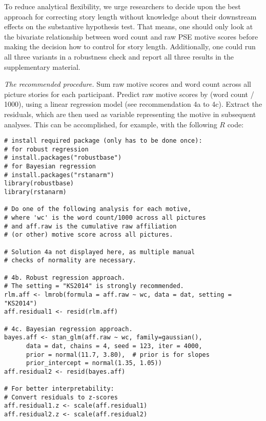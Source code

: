 \documentclass[man,a4paper,mask]{apa6}
\begin{document}
{To reduce analytical flexibility, we urge researchers to decide upon the best approach for correcting story length without knowledge about their downstream effects on the substantive hypothesis test. That means, one should only look at the bivariate relationship between word count and raw PSE motive scores before making the decision how to control for story length. Additionally, one could run all three variants in a robustness check and report all three results in the supplementary material.




\emph{The recommended procedure.} Sum raw motive scores and word count across all picture stories for each participant. Predict raw motive scores by (word count / 1000), using a linear regression model (see recommendation 4a to 4c). Extract the residuals, which are then used as variable representing the motive in subsequent analyses. This can be accomplished, for example, with the following $R$ code:

\begin{lstlisting}
# install required package (only has to be done once):
# for robust regression
# install.packages("robustbase")  
# for Bayesian regression
# install.packages("rstanarm")
library(robustbase)
library(rstanarm)

# Do one of the following analysis for each motive,
# where 'wc' is the word count/1000 across all pictures
# and aff.raw is the cumulative raw affiliation 
# (or other) motive score across all pictures.

# Solution 4a not displayed here, as multiple manual
# checks of normality are necessary.

# 4b. Robust regression approach. 
# The setting = "KS2014" is strongly recommended.
rlm.aff <- lmrob(formula = aff.raw ~ wc, data = dat, setting = "KS2014")
aff.residual1 <- resid(rlm.aff)

# 4c. Bayesian regression approach.
bayes.aff <- stan_glm(aff.raw ~ wc, family=gaussian(), 
      data = dat, chains = 4, seed = 123, iter = 4000,
      prior = normal(11.7, 3.80),  # prior is for slopes
      prior_intercept = normal(1.35, 1.05))
aff.residual2 <- resid(bayes.aff)

# For better interpretability: 
# Convert residuals to z-scores
aff.residual1.z <- scale(aff.residual1)
aff.residual2.z <- scale(aff.residual2)
\end{lstlisting}

}
\end{document}
